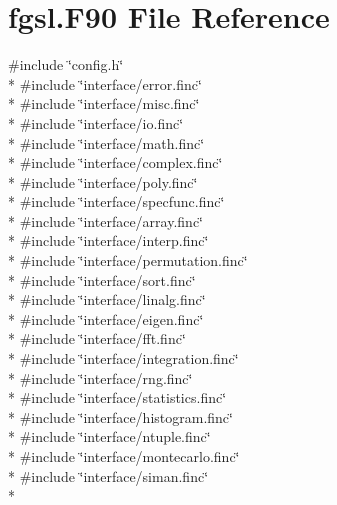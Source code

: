 \hypertarget{fgsl_8F90}{}\section{fgsl.\+F90 File Reference}
\label{fgsl_8F90}
{\ttfamily \#include \char`\"{}config.\+h\char`\"{}}\\*
{\ttfamily \#include \char`\"{}interface/error.\+finc\char`\"{}}\\*
{\ttfamily \#include \char`\"{}interface/misc.\+finc\char`\"{}}\\*
{\ttfamily \#include \char`\"{}interface/io.\+finc\char`\"{}}\\*
{\ttfamily \#include \char`\"{}interface/math.\+finc\char`\"{}}\\*
{\ttfamily \#include \char`\"{}interface/complex.\+finc\char`\"{}}\\*
{\ttfamily \#include \char`\"{}interface/poly.\+finc\char`\"{}}\\*
{\ttfamily \#include \char`\"{}interface/specfunc.\+finc\char`\"{}}\\*
{\ttfamily \#include \char`\"{}interface/array.\+finc\char`\"{}}\\*
{\ttfamily \#include \char`\"{}interface/interp.\+finc\char`\"{}}\\*
{\ttfamily \#include \char`\"{}interface/permutation.\+finc\char`\"{}}\\*
{\ttfamily \#include \char`\"{}interface/sort.\+finc\char`\"{}}\\*
{\ttfamily \#include \char`\"{}interface/linalg.\+finc\char`\"{}}\\*
{\ttfamily \#include \char`\"{}interface/eigen.\+finc\char`\"{}}\\*
{\ttfamily \#include \char`\"{}interface/fft.\+finc\char`\"{}}\\*
{\ttfamily \#include \char`\"{}interface/integration.\+finc\char`\"{}}\\*
{\ttfamily \#include \char`\"{}interface/rng.\+finc\char`\"{}}\\*
{\ttfamily \#include \char`\"{}interface/statistics.\+finc\char`\"{}}\\*
{\ttfamily \#include \char`\"{}interface/histogram.\+finc\char`\"{}}\\*
{\ttfamily \#include \char`\"{}interface/ntuple.\+finc\char`\"{}}\\*
{\ttfamily \#include \char`\"{}interface/montecarlo.\+finc\char`\"{}}\\*
{\ttfamily \#include \char`\"{}interface/siman.\+finc\char`\"{}}\\*
